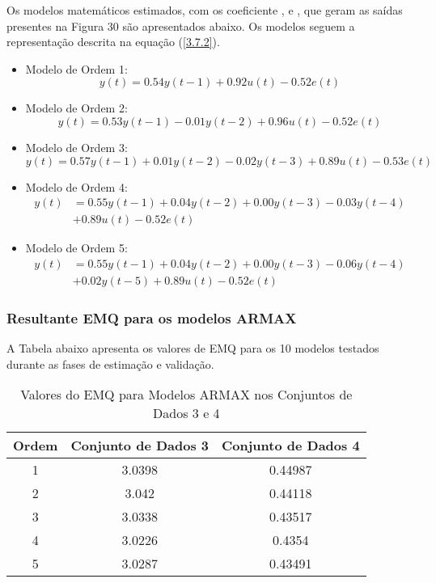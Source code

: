 \documentclass[a4paper,12pt]{article}
\begin{document}
Os modelos matemáticos estimados, com os coeficiente ,  e , que geram as saídas presentes na Figura 30 são apresentados abaixo. Os modelos seguem a representação descrita na equação (\ref{3.7.2}).
\begin{itemize}
    \item Modelo de Ordem 1:
    \begin{equation*}
    y(t) = 0.54y(t-1) + 0.92u(t) - 0.52e(t)
    \end{equation*}
    
    \item Modelo de Ordem 2:
    \begin{equation*}
    y(t) = 0.53y(t-1) - 0.01y(t-2) + 0.96u(t) - 0.52e(t)
    \end{equation*}
    
    \item Modelo de Ordem 3:
    \begin{equation*}
    y(t) = 0.57y(t-1) + 0.01y(t-2) - 0.02y(t-3) + 0.89u(t) - 0.53e(t)
    \end{equation*}
    
    \item Modelo de Ordem 4:
    \begin{align}
    y(t) &= 0.55y(t-1) + 0.04y(t-2) + 0.00y(t-3) - 0.03y(t-4) \nonumber\\
    &+ 0.89u(t) - 0.52e(t) \nonumber
    \end{align}
    
    \item Modelo de Ordem 5:
    \begin{align}
    y(t) &= 0.55y(t-1) + 0.04y(t-2) + 0.00y(t-3) - 0.06y(t-4)\nonumber \\
    &+ 0.02y(t-5) + 0.89u(t) - 0.52e(t) \nonumber
    \end{align}
\end{itemize}

\subsubsection{Resultante EMQ para os modelos ARMAX}

A Tabela abaixo apresenta os valores de EMQ para os 10 modelos testados durante as fases de estimação e validação.

\begin{table}[h!]
    \centering
    \label{tab:emq_results_armax}
    \begin{tabular}{|c|c|c|}
        \hline
        Ordem & Conjunto de Dados 3 & Conjunto de Dados 4 \\
        \hline
        1 & 3.0398 & 0.44987 \\
        2 & 3.042 & 0.44118 \\
        3 & 3.0338 & 0.43517 \\
        4 & 3.0226 & 0.4354 \\
        5 & 3.0287 & 0.43491 \\
        \hline
    \end{tabular}
    \caption{Valores do EMQ para Modelos ARMAX nos Conjuntos de Dados 3 e 4}
\end{table}
\end{document}
